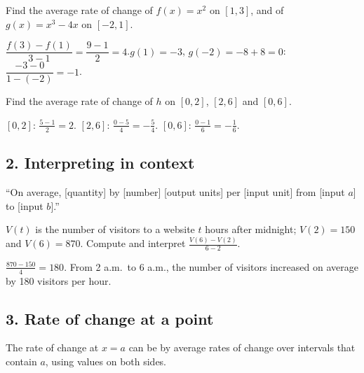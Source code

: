 Find the average rate of change of $f(x)=x^2$ on $[1,3]$, and of $g(x)=x^3-4x$ on $[-2,1]$.
\begin{workspace}[3cm]
$\dfrac{f(3)-f(1)}{3-1}=\dfrac{9-1}{2}=4$.\qquad $g(1)=-3$, $g(-2)=-8+8=0$: $\dfrac{-3-0}{1-(-2)}=-1$.
\end{workspace}

\begin{center}
\end{center}
Find the average rate of change of $h$ on $[0,2]$, $[2,6]$ and $[0,6]$.
\begin{workspace}[2.6cm]
$[0,2]$: $\frac{5-1}{2}=2$. \quad $[2,6]$: $\frac{0-5}{4}=-\frac54$. \quad $[0,6]$: $\frac{0-1}{6}=-\frac16$.
\end{workspace}

\subsection*{2. Interpreting in context}
\begin{keyidea}[Template]
``On average, [quantity]  by [number] [output units] per [input unit] from [input $a$] to [input $b$].''
\end{keyidea}

$V(t)$ is the number of visitors to a website $t$ hours after midnight; $V(2)=150$ and $V(6)=870$. Compute and interpret $\frac{V(6)-V(2)}{6-2}$.
\begin{workspace}[2.4cm]
$\frac{870-150}{4}=180$. From 2 a.m.\ to 6 a.m., the number of visitors increased on average by 180 visitors per hour.
\end{workspace}

\subsection*{3. Rate of change at a point}
The rate of change at $x=a$ can be  by average rates of change over  intervals that contain $a$, using values on both sides.

